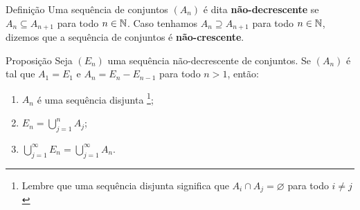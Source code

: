 \begin{env}{Definição}
\label{def:sequência-crescente-decrescente-de-conjuntos}
    Uma sequência de conjuntos $(A_n)$ é dita \textbf{não-decrescente} se $A_n \subseteq A_{n+1}$ para todo $n \in \operatorname{\mathbb{N}}$.
    Caso tenhamos $A_n \supseteq A_{n+1}$ para todo $n \in \operatorname{\mathbb{N}}$, dizemos que a sequência de conjuntos é \textbf{não-crescente}.
\end{env}

\begin{env}{Proposição}
\label{prop:sequencia-crescente-conjuntos-resultado-A_n}
Seja $(E_n)$ uma sequência não-decrescente de conjuntos. Se $(A_n)$ é tal que $A_1 = E_1$ e $A_n = E_n - E_{n -1}$ para todo $n > 1$, então:
\begin{enumerate}[label* = (\roman*)]
    \item $A_n$ é uma sequência disjunta
        \footnote{
        	Lembre que uma sequência disjunta significa que $A_i \cap A_j = \varnothing$ para todo $i \neq j$};
    \item $E_n = \displaystyle \bigcup_{j = 1}^n A_j$;
    \item $\displaystyle \bigcup_{j = 1}^\infty E_n = \displaystyle \bigcup_{j = 1}^\infty A_n$.
\end{enumerate}
\end{env}

